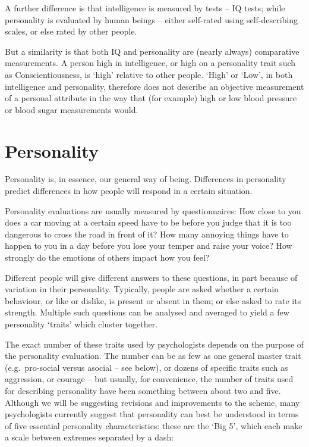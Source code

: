 \documentclass[
]{book}
\begin{document}
A further difference is that intelligence is measured by tests -- IQ tests; while personality is evaluated by human beings -- either self-rated using self-describing scales, or else rated by other people.

But a similarity is that both IQ and personality are (nearly always) comparative measurements. A person high in intelligence, or high on a personality trait such as Conscientiousness, is `high' relative to other people. `High' or `Low', in both intelligence and personality, therefore does not describe an objective measurement of a personal attribute in the way that (for example) high or low blood pressure or blood sugar measurements would.

\hypertarget{personality}{%
\section{Personality}\label{personality}}

Personality is, in essence, our general way of being. Differences in personality predict differences in how people will respond in a certain situation.

Personality evaluations are usually measured by questionnaires: How close to you does a car moving at a certain speed have to be before you judge that it is too dangerous to cross the road in front of it? How many annoying things have to happen to you in a day before you lose your temper and raise your voice? How strongly do the emotions of others impact how you feel?

Different people will give different answers to these questions, in part because of variation in their personality. Typically, people are asked whether a certain behaviour, or like or dislike, is present or absent in them; or else asked to rate its strength. Multiple such questions can be analysed and averaged to yield a few personality `traits' which cluster together.

The exact number of these traits used by psychologists depends on the purpose of the personality evaluation. The number can be as few as one general master trait (e.g.~pro-social versus asocial -- see below), or dozens of specific traits such as aggression, or courage -- but usually, for convenience, the number of traits used for describing personality have been something between about two and five.
Although we will be suggesting revisions and improvements to the scheme, many psychologists currently suggest that personality can best be understood in terms of five essential personality characteristics: these are the `Big 5', which each make a scale between extremes separated by a dash:
\end{document}
